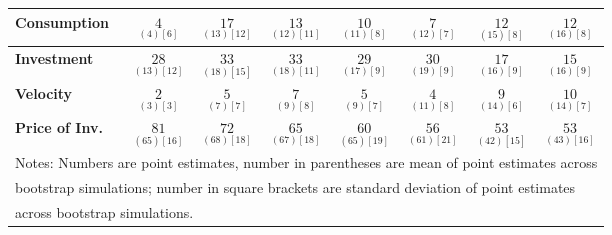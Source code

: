 \documentclass{article}
\begin{document}
\begin{tabular}{|l|c|@{}c|c|@{}c|c|@{}c|c|}
 \textbf{Consumption} & $\underset{(  4) [  6]}{  4}$ & $\underset{( 13) [ 12]}{ 17}$ & $\underset{( 12) [ 11]}{ 13}$ & $\underset{( 11) [  8]}{ 10}$ & $\underset{( 12) [  7]}{  7}$ & $\underset{( 15) [  8]}{ 12}$ & $\underset{( 16) [  8]}{ 12}$ \\ \hline 
 \textbf{Investment} & $\underset{( 13) [ 12]}{ 28}$ & $\underset{( 18) [ 15]}{ 33}$ & $\underset{( 18) [ 11]}{ 33}$ & $\underset{( 17) [  9]}{ 29}$ & $\underset{( 19) [  9]}{ 30}$ & $\underset{( 16) [  9]}{ 17}$ & $\underset{( 16) [  9]}{ 15}$ \\ \hline 
 \textbf{Velocity} & $\underset{(  3) [  3]}{  2}$ & $\underset{(  7) [  7]}{  5}$ & $\underset{(  9) [  8]}{  7}$ & $\underset{(  9) [  7]}{  5}$ & $\underset{( 11) [  8]}{  4}$ & $\underset{( 14) [  6]}{  9}$ & $\underset{( 14) [  7]}{ 10}$ \\ \hline 
 \textbf{Price of Inv.} & $\underset{( 65) [ 16]}{ 81}$ & $\underset{( 68) [ 18]}{ 72}$ & $\underset{( 67) [ 18]}{ 65}$ & $\underset{( 65) [ 19]}{ 60}$ & $\underset{( 61) [ 21]}{ 56}$ & $\underset{( 42) [ 15]}{ 53}$ & $\underset{( 43) [ 16]}{ 53}$ \\ \hline 
 \multicolumn{8}{|l|}{Notes: Numbers are point estimates, number in 
 parentheses are mean of point estimates across} \\ \hline 
 \multicolumn{8}{|l|}{bootstrap simulations; number in square brackets are 
 standard deviation of point estimates} \\ \hline 
 \multicolumn{8}{|l|}{across bootstrap simulations.} \\ \hline 
 \end{tabular} 
\end{document}
